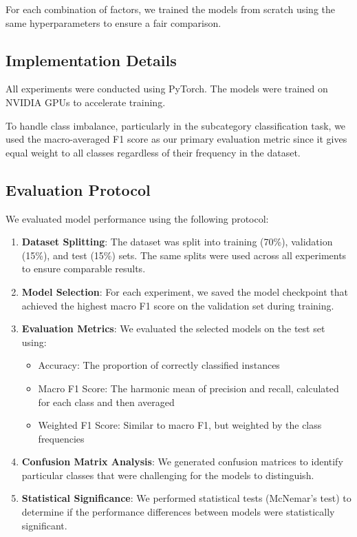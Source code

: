 \documentclass[10pt,journal,compsoc]{IEEEtran}
\begin{document}
For each combination of factors, we trained the models from scratch using the same hyperparameters to ensure a fair comparison.

\subsection{Implementation Details}
All experiments were conducted using PyTorch. The models were trained on NVIDIA GPUs to accelerate training.

To handle class imbalance, particularly in the subcategory classification task, we used the macro-averaged F1 score as our primary evaluation metric since it gives equal weight to all classes regardless of their frequency in the dataset.

\subsection{Evaluation Protocol}
We evaluated model performance using the following protocol:

\begin{enumerate}
\item \textbf{Dataset Splitting}: The dataset was split into training (70\%), validation (15\%), and test (15\%) sets. The same splits were used across all experiments to ensure comparable results.

\item \textbf{Model Selection}: For each experiment, we saved the model checkpoint that achieved the highest macro F1 score on the validation set during training.

\item \textbf{Evaluation Metrics}: We evaluated the selected models on the test set using:
\begin{itemize}
\item Accuracy: The proportion of correctly classified instances
\item Macro F1 Score: The harmonic mean of precision and recall, calculated for each class and then averaged
\item Weighted F1 Score: Similar to macro F1, but weighted by the class frequencies
\end{itemize}

\item \textbf{Confusion Matrix Analysis}: We generated confusion matrices to identify particular classes that were challenging for the models to distinguish.

\item \textbf{Statistical Significance}: We performed statistical tests (McNemar's test) to determine if the performance differences between models were statistically significant.
\end{enumerate}
\end{document}
